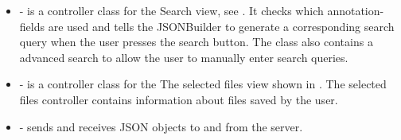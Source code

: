 \begin{itemize}
\item {} - is a controller class for the Search view, see . It checks which annotation-fields are used and tells the JSONBuilder to generate a corresponding search query when the user presses the search button. The class also contains a advanced search to allow the user to manually enter search queries. 

\item {} - is a controller class for the The selected files view shown in . The selected files controller contains information about files saved by the user.

\item {} - sends and receives JSON objects to and from the server.

\end{itemize}
